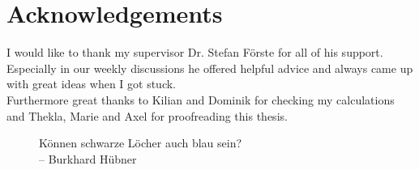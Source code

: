 \chapter*{Acknowledgements}
\label{sec:ack}
I would like to thank my supervisor Dr. Stefan Förste for all of his support. Especially in our weekly discussions he offered helpful advice and always came up with great ideas when I got stuck.\\

Furthermore great thanks to Kilian and Dominik for checking my calculations and Thekla, Marie and Axel for proofreading this thesis. 
\newpage
\begin{figure}
\centering
\huge{Können schwarze Löcher auch blau sein?}\\
\hspace{7cm} \large{-- Burkhard Hübner}
\end{figure}

